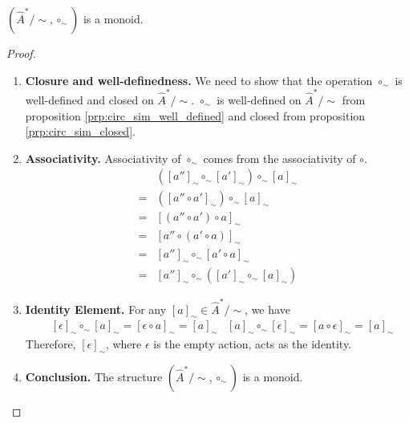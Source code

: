 \begin{proposition}
    $(\hat{A}^{\ast}/\sim, \circ_{\sim})$ is a monoid.
\end{proposition}
\begin{proof}
    \begin{enumerate}[(1)]
        \item \textbf{Closure and well-definedness.}
              We need to show that the operation $\circ_{\sim}$ is well-defined and closed on $\hat{A}^{\ast}/\sim$.
              $\circ_{\sim}$ is well-defined on $\hat{A}^{\ast}/\sim$ from proposition \ref{prp:circ_sim_well_defined} and closed from proposition \ref{prp:circ_sim_closed}.

        \item \textbf{Associativity.}
              Associativity of $\circ_{\sim}$ comes from the associativity of $\circ$.
              \begin{align}
                      & ([a'']_{\sim} \circ_{\sim} [a']_{\sim}) \circ_{\sim} [a]_{\sim} \\
                  ={} & ([a'' \circ a']_{\sim}) \circ_{\sim} [a]_{\sim}                 \\
                  ={} & [ (a'' \circ a') \circ a ]_{\sim}                               \\
                  ={} & [ a'' \circ (a' \circ a) ]_{\sim}                               \\
                  ={} & [a'']_{\sim} \circ_{\sim} [a' \circ a]_{\sim}                   \\
                  ={} & [a'']_{\sim} \circ_{\sim} ([a']_{\sim} \circ_{\sim} [a]_{\sim})
              \end{align}

        \item \textbf{Identity Element.}
              For any $[a]_{\sim} \in \hat{A}^{\ast}/\sim$, we have
              \begin{align}
                   & [\epsilon]_{\sim} \circ_{\sim} [a]_{\sim} = [\epsilon \circ a]_{\sim} = [a]_{\sim}
                   & [a]_{\sim} \circ_{\sim} [\epsilon]_{\sim} = [a \circ \epsilon]_{\sim} = [a]_{\sim}
              \end{align}
              Therefore, $[\epsilon]_{\sim}$, where $\epsilon$ is the empty action, acts as the identity.

        \item \textbf{Conclusion.}
              The structure $(\hat{A}^{\ast}/\sim, \circ_{\sim})$ is a monoid.
    \end{enumerate}
\end{proof}


